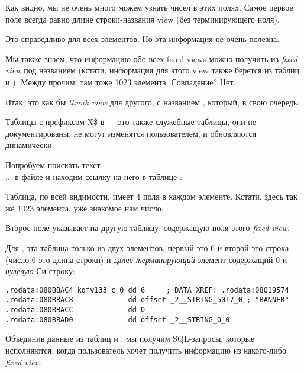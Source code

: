 Как видно, мы не очень много можем узнать чисел в этих полях. Самое первое поле всегда равно длине строки-названия view (без терминирующего ноля).

Это справедливо для всех элементов. Но эта информация не очень полезна.

Мы также знаем, что информацию обо всех fixed views можно получить из \emph{fixed view} под названием
(кстати, информация для этого view также берется из таблиц  и ).
Между прочим, там тоже 1023 элемента. Совпадение? Нет.



Итак,  это как бы \emph{thunk view} для другого, с названием , который, в свою очередь:



Таблицы с префиксом X\$ в \oracle --- это также служебные таблицы, они не документированы,
не могут изменятся пользователем, и обновляются динамически.

Попробуем поискать текст \\

... в файле  и находим ссылку на него в таблице :



Таблица, по всей видимости, имеет 4 поля в каждом элементе. Кстати, здесь так же 1023 элемента, уже знакомое нам число.

Второе поле указывает на другую таблицу, содержащую поля этого \emph{fixed view}.

Для , эта таблица только из двух элементов, первый это 6 и второй это строка 
 (число 6 это длина строки) и далее \emph{терминирующий} элемент содержащий 0 и \emph{нулевую} 
Си-строку:

\begin{lstlisting}[caption=kqf.o,style=customasmx86]
.rodata:080BBAC4 kqfv133_c_0 dd 6     ; DATA XREF: .rodata:08019574
.rodata:080BBAC8             dd offset _2__STRING_5017_0 ; "BANNER"
.rodata:080BBACC             dd 0
.rodata:080BBAD0             dd offset _2__STRING_0_0
\end{lstlisting}

Объединив данные из таблиц  и , мы получим SQL-запросы, которые исполняются, когда пользователь хочет получить информацию из какого-либо \emph{fixed view}.

